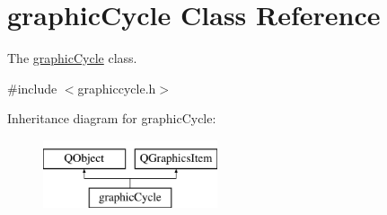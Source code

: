 \hypertarget{classgraphic_cycle}{}\section{graphic\+Cycle Class Reference}
\label{classgraphic_cycle}


The \mbox{\hyperlink{classgraphic_cycle}{graphic\+Cycle}} class.  




{\ttfamily \#include $<$graphiccycle.\+h$>$}

Inheritance diagram for graphic\+Cycle\+:\begin{figure}[H]
\begin{center}
\leavevmode
\includegraphics[height=2.000000cm]{classgraphic_cycle}
\end{center}
\end{figure}
